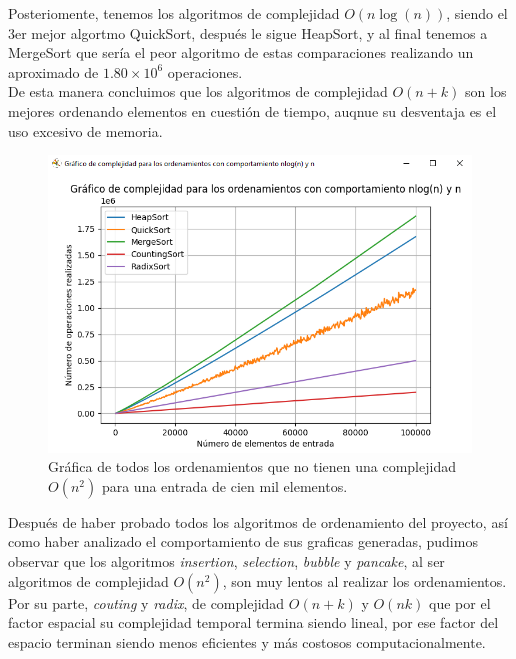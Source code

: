 \documentclass[a4paper,12pt]{article}
\begin{document}
Posteriomente, tenemos los algoritmos de complejidad $O(n\log(n))$, siendo el 3er mejor algortmo QuickSort, después le sigue HeapSort, y al final tenemos a MergeSort que sería el peor algoritmo de estas comparaciones realizando un aproximado de $1.80 \times 10^6$ operaciones.\\

De esta manera concluimos que los algoritmos de complejidad $O(n+k)$ son los mejores ordenando elementos en cuestión de tiempo, auqnue su desventaja es el uso excesivo de memoria.\\ 

\begin{figure}[h]
    \centering
    \includegraphics[width=1\textwidth]{media/graficaE_100k.png}
    \caption{Gráfica de todos los ordenamientos que no tienen una complejidad $O(n^2)$ para una entrada de cien mil elementos.}
    \label{fig:grafE_100k}
\end{figure}

Después de haber probado todos los algoritmos de ordenamiento del proyecto, así como haber analizado el comportamiento de sus graficas generadas, pudimos observar que los algoritmos \textit{insertion}, \textit{selection}, \textit{bubble} y \textit{pancake}, al ser algoritmos de complejidad $O(n^2)$, son muy lentos al realizar los ordenamientos. Por su parte, \textit{couting} y \textit{radix}, de complejidad $O(n+k)$ y $O(nk)$ que por el factor espacial su complejidad temporal termina siendo lineal, por ese factor del espacio terminan siendo menos eficientes y más costosos computacionalmente.\\
\end{document}
